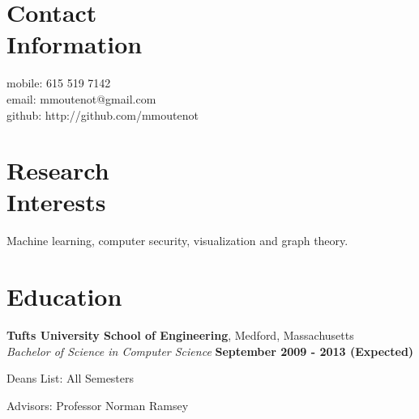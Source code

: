 \documentclass[margin,line]{resume}
\begin{document}
\begin{resume}

    \section{\mysidestyle Contact\\Information}

	mobile: 615 519 7142
	\vspace{0mm}\\\vspace{0mm}%
	email: mmoutenot@gmail.com
	\vspace{0mm}\\\vspace{0mm}%
	github: http://github.com/mmoutenot
	\vspace{0mm}\\\vspace{-4.5mm}%


    \section{\mysidestyle Research\\Interests}

    Machine learning, computer security, visualization and graph theory.

    \section{\mysidestyle Education}

    \textbf{Tufts University School of Engineering}, Medford, Massachusetts \vspace{2mm}\\\vspace{1mm}%
    \textsl{Bachelor of Science in Computer Science} \hfill \textbf{ September 2009 - 2013 (Expected)}\vspace{-3mm}\\\vspace{-1mm}%
    \begin{list2}
        \item Deans List: All Semesters
        \item Advisors:  Professor Norman Ramsey
    \end{list2}\vspace{-1.5mm}
    

\end{resume}
\end{document}
